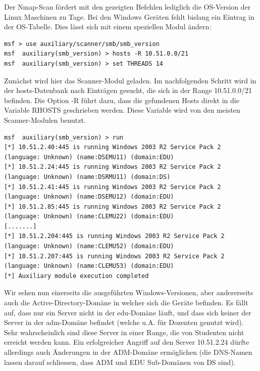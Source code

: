 \documentclass[a4paper,11pt]{scrartcl}
\begin{document}
Der Nmap-Scan fördert mit den gezeigten Befehlen lediglich die OS-Version der Linux Maschinen zu Tage. Bei den Windows Geräten fehlt bislang ein Eintrag in der OS-Tabelle. Dies lässt sich mit einem speziellen Modul ändern:
\begin{lstlisting}
msf > use auxiliary/scanner/smb/smb_version 
msf  auxiliary(smb_version) > hosts -R 10.51.0.0/21
msf  auxiliary(smb_version) > set THREADS 14
\end{lstlisting}
Zunächst wird hier das Scanner-Modul geladen. Im nachfolgenden Schritt wird in der hosts-Datenbank nach Einträgen gesucht, die sich in der Range 10.51.0.0/21 befinden. Die Option -R führt dazu, dass die gefundenen Hosts direkt in die Variable RHOSTS geschrieben werden. Diese Variable wird von den meisten Scanner-Modulen benutzt.
\begin{lstlisting}
msf  auxiliary(smb_version) > run 
[*] 10.51.2.40:445 is running Windows 2003 R2 Service Pack 2 (language: Unknown) (name:DSEMU11) (domain:EDU)
[*] 10.51.2.24:445 is running Windows 2003 R2 Service Pack 2 (language: Unknown) (name:DSRMU11) (domain:DS)
[*] 10.51.2.41:445 is running Windows 2003 R2 Service Pack 2 (language: Unknown) (name:DSEMU12) (domain:EDU)
[*] 10.51.2.85:445 is running Windows 2003 R2 Service Pack 2 (language: Unknown) (name:CLEMU22) (domain:EDU)
[.......]
[*] 10.51.2.204:445 is running Windows 2003 R2 Service Pack 2 (language: Unknown) (name:CLEMU52) (domain:EDU)
[*] 10.51.2.207:445 is running Windows 2003 R2 Service Pack 2 (language: Unknown) (name:CLEMU53) (domain:EDU)
[*] Auxiliary module execution completed
\end{lstlisting}
Wir sehen nun einerseits die ausgeführten Windows-Versionen, aber andererseits auch die Active-Directory-Domäne in welcher sich die Geräte befinden. Es fällt auf, dass nur ein Server nicht in der edu-Domäne läuft, und dass sich keiner der Server in der adm-Domäne befindet (welche u.A. für Dozenten genutzt wird). Sehr wahrscheinlich sind diese Server in einer Range, die von Studenten nicht erreicht werden kann. Ein erfolgreicher Angriff auf den Server 10.51.2.24 dürfte allerdings auch Änderungen in der ADM-Domäne ermöglichen (die DNS-Namen lassen darauf schliessen, dass ADM und EDU Sub-Domänen von DS sind).
\end{document}
